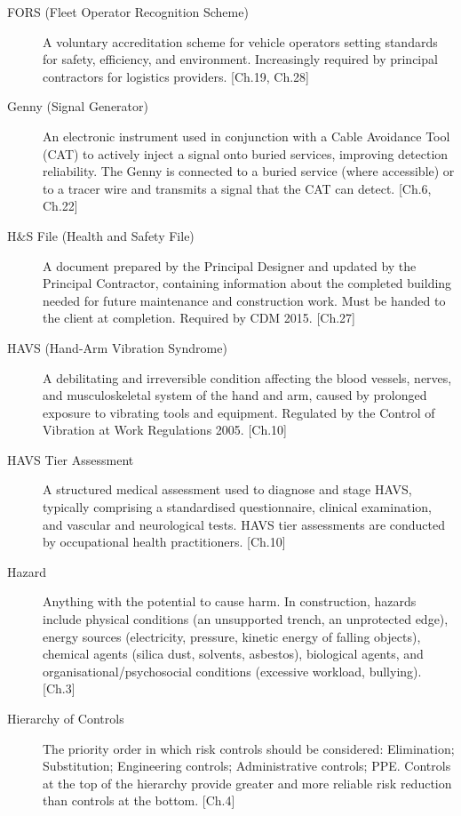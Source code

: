\begin{description}
\item[FORS (Fleet Operator Recognition Scheme)] A voluntary accreditation scheme for vehicle operators setting standards for safety, efficiency, and environment. Increasingly required by principal contractors for logistics providers. [Ch.19, Ch.28]

\item[Genny (Signal Generator)] An electronic instrument used in conjunction with a Cable Avoidance Tool (CAT) to actively inject a signal onto buried services, improving detection reliability. The Genny is connected to a buried service (where accessible) or to a tracer wire and transmits a signal that the CAT can detect. [Ch.6, Ch.22]

\item[H\&S File (Health and Safety File)] A document prepared by the Principal Designer and updated by the Principal Contractor, containing information about the completed building needed for future maintenance and construction work. Must be handed to the client at completion. Required by CDM 2015. [Ch.27]

\item[HAVS (Hand-Arm Vibration Syndrome)] A debilitating and irreversible condition affecting the blood vessels, nerves, and musculoskeletal system of the hand and arm, caused by prolonged exposure to vibrating tools and equipment. Regulated by the Control of Vibration at Work Regulations 2005. [Ch.10]

\item[HAVS Tier Assessment] A structured medical assessment used to diagnose and stage HAVS, typically comprising a standardised questionnaire, clinical examination, and vascular and neurological tests. HAVS tier assessments are conducted by occupational health practitioners. [Ch.10]

\item[Hazard] Anything with the potential to cause harm. In construction, hazards include physical conditions (an unsupported trench, an unprotected edge), energy sources (electricity, pressure, kinetic energy of falling objects), chemical agents (silica dust, solvents, asbestos), biological agents, and organisational/psychosocial conditions (excessive workload, bullying). [Ch.3]

\item[Hierarchy of Controls] The priority order in which risk controls should be considered: Elimination; Substitution; Engineering controls; Administrative controls; PPE. Controls at the top of the hierarchy provide greater and more reliable risk reduction than controls at the bottom. [Ch.4]


\end{description}
